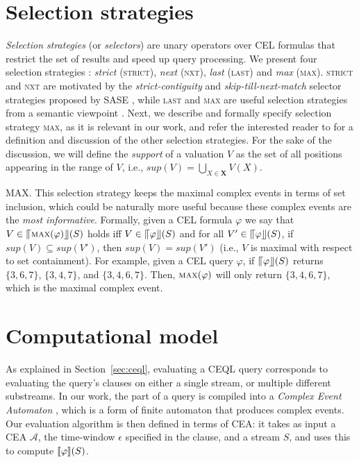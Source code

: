 \section{Selection strategies}\label{sec:selection_strategies}

\emph{Selection strategies} (or \emph{selectors}) are unary operators over CEL formulas that restrict the set of results and speed up query processing. We present four selection strategies \cite{formal-framework-cep,formal-framework-cer}: \emph{strict} (\textsc{strict}), \emph{next} (\textsc{nxt}), \emph{last} (\textsc{last}) and \emph{max} (\textsc{max}). \textsc{strict} and \textsc{nxt} are motivated by the \emph{strict-contiguity} and \emph{skip-till-next-match} selector strategies proposed by SASE \cite{sase}, while \textsc{last} and \textsc{max} are useful selection strategies from a semantic viewpoint \cite{formal-framework-cer}. Next, we describe and formally specify selection strategy \textsc{max}, as it is relevant in our work, and refer the interested reader to \cite{formal-framework-cer} for a definition and discussion of the other selection strategies. For the sake of the discussion, we will define the \emph{support} of a valuation $V$ as the set of all positions appearing in the range of $V$, i.e., $sup(V) = \bigcup\limits_{X \in \textbf{X}}V(X)$.

\textsc{MAX}. This selection strategy keeps the maximal complex events in terms of set inclusion, which could be naturally more useful because these complex events are the \emph{most informative}. Formally, given a CEL formula $\varphi$ we say that $V \in \llceil \textsc{max}(\varphi) \rrfloor(S)$ holds iff $V \in \llceil \varphi \rrfloor(S)$ and for all $V' \in \llceil \varphi \rrfloor(S)$, if $sup(V) \subseteq sup(V')$, then $sup(V) = sup(V')$ (i.e., $V$ is maximal with respect to set containment). For example, given a CEL query $\varphi$, if $\llceil \varphi \rrfloor(S)$ returns $\{ 3,6,7\}$, $\{3,4,7\}$, and $\{3,4,6,7\}$. Then, $\textsc{max}(\varphi)$ will only return $\{ 3, 4, 6, 7\}$, which is the maximal complex event.

\section{Computational model}\label{sec:cea}

As explained in Section~\ref{sec:ceql}, evaluating a CEQL query corresponds to evaluating the query's  clauses on either a single stream, or multiple different substreams. In our work, the  part of a query is compiled into a \emph{Complex Event Automaton} \cite{formal-framework-cep,formal-framework-cer}, which is a form of finite automaton that produces complex events. Our evaluation algorithm is then defined in terms of CEA: it takes as input a CEA $\mathcal{A}$, the time-window $\epsilon$ specified in the  clause, and a stream $S$, and uses this to compute $\llbracket \varphi \rrbracket(S)$.

